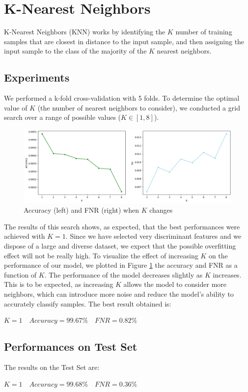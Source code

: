 \documentclass[twocolumn, switch]{article} %
\newcommand\x{0.7}
\begin{document}
\section{K-Nearest Neighbors}
\label{sec:knn}
K-Nearest Neighbors (KNN) works by identifying the $K$ number of training samples that are closest in distance to the input sample, and then assigning the input sample to the class of the majority of the $K$ nearest neighbors.
\subsection{Experiments}
We performed a k-fold cross-validation with 5 folds.
To determine the optimal value of $K$ (the number of nearest neighbors to consider), we conducted a grid search over a range of possible values ($K \in [1, 8]$).
\begin{figure}[ht!]
	\centering
	\includegraphics[width=\x\linewidth]{knn_accuracy_fnr.png}
	\caption{Accuracy (left) and FNR (right) when $K$ changes}
	\label{fig:knntrain}
\end{figure}
The results of this search shows, as expected, that the best performances were achieved with $K=1$. Since we have selected very discriminant features and we dispose of a large and diverse dataset, we expect that the possible overfitting effect will not be really high.
To visualize the effect of increasing $K$ on the performance of our model, we plotted in Figure \ref{fig:knntrain} the accuracy and FNR as a function of $K$. The performance of the model decreases slightly as $K$ increases. This is to be expected, as increasing $K$ allows the model to consider more neighbors, which can introduce more noise and reduce the model's ability to accurately classify samples. The best result obtained is:
\begin{center}
	$K=1 \quad Accuracy=99.67\% \quad FNR=0.82\%$
\end{center}

\subsection{Performances on Test Set}
The results on the Test Set are:
\begin{center}
	$K=1 \quad Accuracy=99.68\% \quad FNR=0.36\%$
\end{center}
\end{document}
